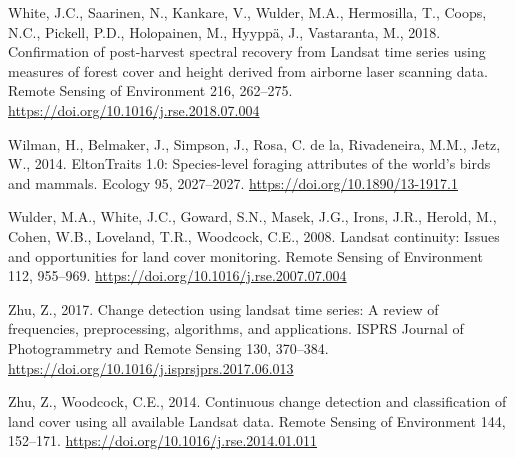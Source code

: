 \documentclass[
  12pt,
]{article}
\newlength{\cslhangindent}
\newlength{\cslentryspacingunit} %
\newenvironment{CSLReferences}[2] %
 {%
  \setlength{\parindent}{0pt}
  \ifodd #1
  \let\oldpar\par
  \def\par{\hangindent=\cslhangindent\oldpar}
  \fi
  \setlength{\parskip}{#2\cslentryspacingunit}
 }%
 {}
\begin{document}
\begin{CSLReferences}{1}{0}
\leavevmode{}%
White, J.C., Saarinen, N., Kankare, V., Wulder, M.A., Hermosilla, T., Coops, N.C., Pickell, P.D., Holopainen, M., Hyyppä, J., Vastaranta, M., 2018. Confirmation of post-harvest spectral recovery from {Landsat} time series using measures of forest cover and height derived from airborne laser scanning data. Remote Sensing of Environment 216, 262--275. \url{https://doi.org/10.1016/j.rse.2018.07.004}

\leavevmode{}%
Wilman, H., Belmaker, J., Simpson, J., Rosa, C. de la, Rivadeneira, M.M., Jetz, W., 2014. {EltonTraits} 1.0: {Species}-level foraging attributes of the world's birds and mammals. Ecology 95, 2027--2027. \url{https://doi.org/10.1890/13-1917.1}

\leavevmode{}%
Wulder, M.A., White, J.C., Goward, S.N., Masek, J.G., Irons, J.R., Herold, M., Cohen, W.B., Loveland, T.R., Woodcock, C.E., 2008. Landsat continuity: {Issues} and opportunities for land cover monitoring. Remote Sensing of Environment 112, 955--969. \url{https://doi.org/10.1016/j.rse.2007.07.004}

\leavevmode{}%
Zhu, Z., 2017. Change detection using landsat time series: {A} review of frequencies, preprocessing, algorithms, and applications. ISPRS Journal of Photogrammetry and Remote Sensing 130, 370--384. \url{https://doi.org/10.1016/j.isprsjprs.2017.06.013}

\leavevmode{}%
Zhu, Z., Woodcock, C.E., 2014. Continuous change detection and classification of land cover using all available {Landsat} data. Remote Sensing of Environment 144, 152--171. \url{https://doi.org/10.1016/j.rse.2014.01.011}

\end{CSLReferences}

\pagebreak
\end{document}

